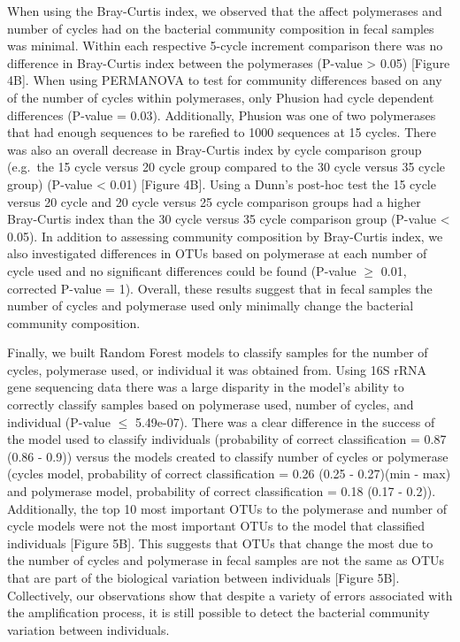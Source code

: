 \documentclass[11pt,]{article}
\begin{document}
When using the Bray-Curtis index, we observed that the affect
polymerases and number of cycles had on the bacterial community
composition in fecal samples was minimal. Within each respective 5-cycle
increment comparison there was no difference in Bray-Curtis index
between the polymerases (P-value \textgreater{} 0.05) {[}Figure 4B{]}.
When using PERMANOVA to test for community differences based on any of
the number of cycles within polymerases, only Phusion had cycle
dependent differences (P-value = 0.03). Additionally, Phusion was one of
two polymerases that had enough sequences to be rarefied to 1000
sequences at 15 cycles. There was also an overall decrease in
Bray-Curtis index by cycle comparison group (e.g.~the 15 cycle versus 20
cycle group compared to the 30 cycle versus 35 cycle group) (P-value
\textless{} 0.01) {[}Figure 4B{]}. Using a Dunn's post-hoc test the 15
cycle versus 20 cycle and 20 cycle versus 25 cycle comparison groups had
a higher Bray-Curtis index than the 30 cycle versus 35 cycle comparison
group (P-value \textless{} 0.05). In addition to assessing community
composition by Bray-Curtis index, we also investigated differences in
OTUs based on polymerase at each number of cycle used and no significant
differences could be found (P-value \(\geqslant\) 0.01, corrected
P-value = 1). Overall, these results suggest that in fecal samples the
number of cycles and polymerase used only minimally change the bacterial
community composition.

Finally, we built Random Forest models to classify samples for the
number of cycles, polymerase used, or individual it was obtained from.
Using 16S rRNA gene sequencing data there was a large disparity in the
model's ability to correctly classify samples based on polymerase used,
number of cycles, and individual (P-value \(\leqslant\) 5.49e-07). There
was a clear difference in the success of the model used to classify
individuals (probability of correct classification = 0.87 (0.86 - 0.9))
versus the models created to classify number of cycles or polymerase
(cycles model, probability of correct classification = 0.26 (0.25 -
0.27)(min - max) and polymerase model, probability of correct
classification = 0.18 (0.17 - 0.2)). Additionally, the top 10 most
important OTUs to the polymerase and number of cycle models were not the
most important OTUs to the model that classified individuals {[}Figure
5B{]}. This suggests that OTUs that change the most due to the number of
cycles and polymerase in fecal samples are not the same as OTUs that are
part of the biological variation between individuals {[}Figure 5B{]}.
Collectively, our observations show that despite a variety of errors
associated with the amplification process, it is still possible to
detect the bacterial community variation between individuals.
\end{document}
